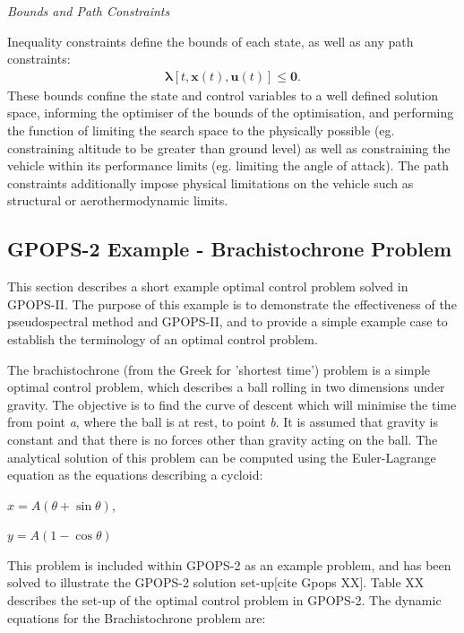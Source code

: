 \noindent \textit{Bounds and Path Constraints}

\noindent Inequality constraints define the bounds of each state, as well as any path constraints:
\begin{eqnarray}
\mathbf{\lambda}[t,\textbf{x}(t),\textbf{u}(t)] \leq \textbf{0}.
\end{eqnarray}
These bounds confine the state and control variables to a well defined solution space, informing the optimiser of the bounds of the optimisation, and performing the function of limiting the search space to the physically possible (eg. constraining altitude to be greater than ground level) as well as constraining the vehicle within its performance limits (eg. limiting the angle of attack).
The path constraints additionally impose physical limitations on the vehicle such as structural or aerothermodynamic limits.












\subsection{GPOPS-2 Example - Brachistochrone Problem}
This section describes a short example optimal control problem solved in GPOPS-II. The purpose of this example is to demonstrate the effectiveness of the pseudospectral method and GPOPS-II, and to provide a simple example case to establish the terminology of an optimal control problem.  


The brachistochrone (from the Greek for 'shortest time') problem is a simple optimal control problem, which describes a ball rolling in two dimensions under gravity. The objective is to find the curve of descent which will minimise the time from point \textit{a}, where the ball is at rest, to point \textit{b}. It is assumed that gravity is constant and that there is no forces other than gravity acting on the ball. 
The analytical solution of this problem can be computed using the Euler-Lagrange equation as the equations describing a cycloid:

$x = A(\theta + \sin\theta) $,

$y=A(1 - \cos\theta)$

This problem is included within GPOPS-2 as an example problem, and has been solved to illustrate the GPOPS-2 solution set-up[cite Gpops XX]. Table XX describes the set-up of the optimal control problem in GPOPS-2. The dynamic equations for the Brachistochrone problem are:

